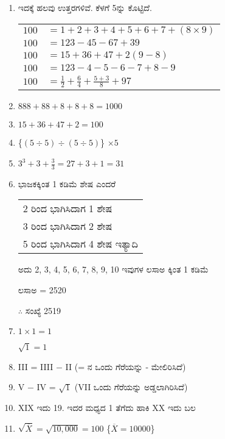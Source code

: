 \begin{enumerate}
\item ಇದಕ್ಕೆ ಹಲವು ಉತ್ತರಗಳಿವೆ. ಕೆಳಗೆ 5ನ್ನು ಕೊಟ್ಟಿದೆ.

\begin{tabular}{ll}
$100$ & $= 1 + 2 + 3 + 4 + 5 + 6 + 7 + (8 \times 9)$\\
$100$ & $= 123 - 45 - 67 + 39$\\
$100$ & $= 15 + 36 + 47 + 2 (9 - 8)$\\
$100$ & $= 123 - 4 - 5 - 6 - 7 + 8 - 9$\\ 
$100$ & $= \frac{1}{2} + \frac{6}{4} + \frac{5 + 3}{8} + 97$
\end{tabular}

\smallskip
\item $888 + 88 + 8 + 8 + 8 = 1000$

\item $15 + 36 + 47 + 2 = 100$

\item \{$(5 \div 5) \div (5 \div 5)$\} $\times 5$

\item $3^{3} + 3 + \frac{3}{3} = 27 + 3 + 1 = 31$

\item ಭಾಜಕಕ್ಕಿಂತ 1 ಕಡಿಮೆ ಶೇಷ ಎಂದರೆ 

\begin{tabular}{l}
2 ರಿಂದ ಭಾಗಿಸಿದಾಗ 1 ಶೇಷ\\
3 ರಿಂದ ಭಾಗಿಸಿದಾಗ 2 ಶೇಷ\\
5 ರಿಂದ ಭಾಗಿಸಿದಾಗ 4 ಶೇಷ ಇತ್ಯಾದಿ
\end{tabular}

ಅದು 2, 3, 4, 5, 6, 7, 8, 9, 10 ಇವುಗಳ ಲಸಾಅ ಕ್ಕಿಂತ 1 ಕಡಿಮೆ 

ಲಸಾಅ = 2520

$\therefore$ ಸಂಖ್ಯೆ  2519

\item $1 \times 1 = 1$

$\sqrt{1} = 1$

\item III = IIII $-$ II (= ನ ಒಂದು ಗೆರೆಯನ್ನು - ಮೇಲಿರಿಸಿದೆ)

\item V $-$ IV = $\sqrt{1}$ (VII ಒಂದು ಗೆರೆಯನ್ನು ಅಡ್ಡಲಾಗಿರಿಸಿದೆ)

\item XIX ಇದು 19. ಇದರ ಮಧ್ಯದ 1 ತೆಗೆದು ಹಾಕಿ XX ಇದು ಬಲ  

\item $\sqrt{\overline{X}} = \sqrt{10,000} = 100$ \{$\overline{X} = 10000$\}


\end{enumerate}
